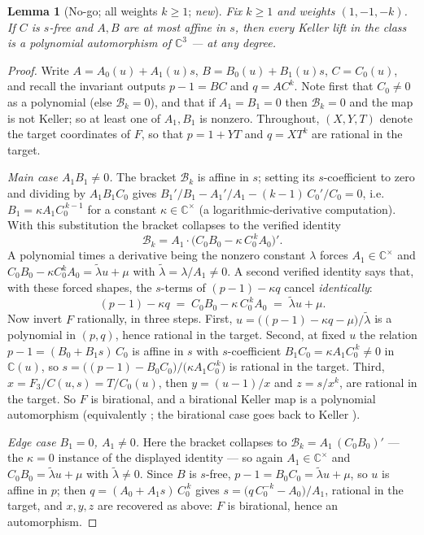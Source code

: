 \documentclass[11pt]{amsart}
\newcommand{\CC}{\mathbb{C}}
\newcommand{\Cstar}{\CC^{\times}}
\newcommand{\brk}{\mathcal{B}}
\theoremstyle{plain}
\newtheorem{lemma}[theorem]{Lemma}
\theoremstyle{definition}
\theoremstyle{remark}
\begin{document}
\begin{lemma}[No-go; all weights $k\ge1$; \emph{new}]\label{lem:nogo}
Fix $k\ge1$ and weights $(1,-1,-k)$. If $C$ is $s$-free and $A,B$ are at
most affine in $s$, then every Keller lift in the class is a polynomial
automorphism of $\CC^{3}$ --- at any degree.
\end{lemma}

\begin{proof}
Write $A=A_{0}(u)+A_{1}(u)s$, $B=B_{0}(u)+B_{1}(u)s$, $C=C_{0}(u)$, and
recall the invariant outputs $p-1=BC$ and $q=AC^{k}$. Note first that
$C_{0}\neq0$ as a polynomial (else $\brk_{k}=0$), and that if
$A_{1}=B_{1}=0$ then $\brk_{k}=0$ and the map is not Keller; so at least
one of $A_{1},B_{1}$ is nonzero. Throughout, $(X,Y,T)$ denote the target
coordinates of $F$, so that $p=1+YT$ and $q=XT^{k}$ are rational in the
target.

\emph{Main case $A_{1}B_{1}\neq0$.} The bracket $\brk_{k}$ is affine in
$s$; setting its $s$-coefficient to zero and dividing by
$A_{1}B_{1}C_{0}$ gives
$B_{1}'/B_{1}-A_{1}'/A_{1}-(k-1)\,C_{0}'/C_{0}=0$, i.e.\
$B_{1}=\kappa A_{1}C_{0}^{\,k-1}$ for a constant $\kappa\in\Cstar$ (a
logarithmic-derivative computation). With this substitution the bracket
collapses to the verified identity
\[
\brk_{k}=A_{1}\cdot\bigl(C_{0}B_{0}-\kappa\,C_{0}^{\,k}A_{0}\bigr)' .
\]
A polynomial times a derivative being the nonzero constant $\lambda$
forces $A_{1}\in\Cstar$ and
$C_{0}B_{0}-\kappa C_{0}^{k}A_{0}=\tilde\lambda u+\mu$ with
$\tilde\lambda=\lambda/A_{1}\neq0$. A second verified identity says
that, with these forced shapes, the $s$-terms of $(p-1)-\kappa q$ cancel
\emph{identically}:
\[
(p-1)-\kappa q\;=\;C_{0}B_{0}-\kappa\,C_{0}^{\,k}A_{0}
\;=\;\tilde\lambda u+\mu .
\]
Now invert $F$ rationally, in three steps. First,
$u=\bigl((p-1)-\kappa q-\mu\bigr)/\tilde\lambda$ is a polynomial in
$(p,q)$, hence rational in the target. Second, at fixed $u$ the relation
$p-1=(B_{0}+B_{1}s)\,C_{0}$ is affine in $s$ with $s$-coefficient
$B_{1}C_{0}=\kappa A_{1}C_{0}^{\,k}\neq0$ in $\CC(u)$, so
$s=\bigl((p-1)-B_{0}C_{0}\bigr)/\bigl(\kappa A_{1}C_{0}^{\,k}\bigr)$ is
rational in the target. Third, $x=F_{3}/C(u,s)=T/C_{0}(u)$, then
$y=(u-1)/x$ and $z=s/x^{k}$, are rational in the target. So $F$ is
birational, and a birational Keller map is a polynomial automorphism
\cite[Corollary~1.1.35]{vdE00} (equivalently
\cite[Theorem~2.1]{BCW82}; the birational case goes back to Keller
\cite{Keller39}).

\emph{Edge case $B_{1}=0$, $A_{1}\neq0$.} Here the bracket collapses to
$\brk_{k}=A_{1}\,(C_{0}B_{0})'$ --- the $\kappa=0$ instance of the
displayed identity --- so again $A_{1}\in\Cstar$ and
$C_{0}B_{0}=\tilde\lambda u+\mu$ with $\tilde\lambda\neq0$. Since $B$ is
$s$-free, $p-1=B_{0}C_{0}=\tilde\lambda u+\mu$, so $u$ is affine in $p$;
then $q=(A_{0}+A_{1}s)\,C_{0}^{\,k}$ gives
$s=\bigl(q\,C_{0}^{-k}-A_{0}\bigr)/A_{1}$, rational in the target, and
$x,y,z$ are recovered as above: $F$ is birational, hence an
automorphism.


\end{proof}
\end{document}
